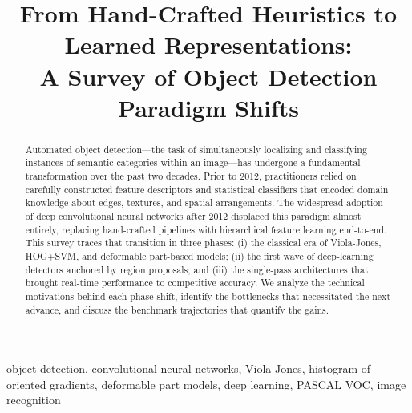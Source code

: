 \documentclass[conference]{IEEEtran}
\begin{document}
\title{From Hand-Crafted Heuristics to Learned Representations:\\
A Survey of Object Detection Paradigm Shifts}

\author{
}

\maketitle

\begin{abstract}
Automated object detection---the task of simultaneously localizing
and classifying instances of semantic categories within an image---has
undergone a fundamental transformation over the past two decades.
Prior to 2012, practitioners relied on carefully constructed feature
descriptors and statistical classifiers that encoded domain knowledge
about edges, textures, and spatial arrangements.
The widespread adoption of deep convolutional neural networks after
2012 displaced this paradigm almost entirely, replacing hand-crafted
pipelines with hierarchical feature learning end-to-end.
This survey traces that transition in three phases:
(i) the classical era of Viola-Jones, HOG+SVM, and deformable
part-based models; (ii) the first wave of deep-learning detectors
anchored by region proposals; and (iii) the single-pass architectures
that brought real-time performance to competitive accuracy.
We analyze the technical motivations behind each phase shift,
identify the bottlenecks that necessitated the next advance, and
discuss the benchmark trajectories that quantify the gains.
\end{abstract}

\begin{IEEEkeywords}
object detection, convolutional neural networks, Viola-Jones,
histogram of oriented gradients, deformable part models,
deep learning, PASCAL VOC, image recognition
\end{IEEEkeywords}

\end{document}
